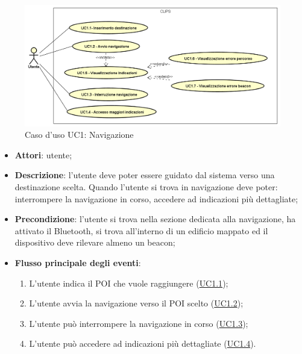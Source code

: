 \documentclass[../AnalisiDeiRequisiti.tex]{subfiles}
\begin{document}
\begin{figure}[H]
	\centering
	\includegraphics[scale=0.95, width=\textwidth]{img/UC1.png}
	\caption{Caso d'uso UC1: Navigazione}\label{fig:UC1} 
\end{figure}
\begin{itemize}
	\item \textbf{Attori}: utente;
	\item \textbf{Descrizione}: l'utente deve poter essere guidato dal sistema verso una destinazione scelta. Quando l'utente si trova in navigazione deve poter: interrompere la navigazione in corso, accedere ad indicazioni più dettagliate; 
	\item \textbf{Precondizione}: l'utente si trova nella sezione dedicata alla navigazione, ha attivato il Bluetooth, si trova all'interno di un edificio mappato ed il dispositivo deve rilevare almeno un beacon;
	
	\item \textbf{Flusso principale degli eventi}:
	\begin{enumerate}
		\item L'utente indica il POI che vuole raggiungere (\hyperlink{UC1.1}{UC1.1});
		\item L'utente avvia la navigazione verso il POI scelto (\hyperlink{UC1.2}{UC1.2});
		\item L'utente può interrompere la navigazione in corso  (\hyperlink{UC1.3}{UC1.3});
		\item L'utente può accedere ad indicazioni più dettagliate  (\hyperlink{UC1.4}{UC1.4}).
		

\end{enumerate}
\end{itemize}
\end{document}
